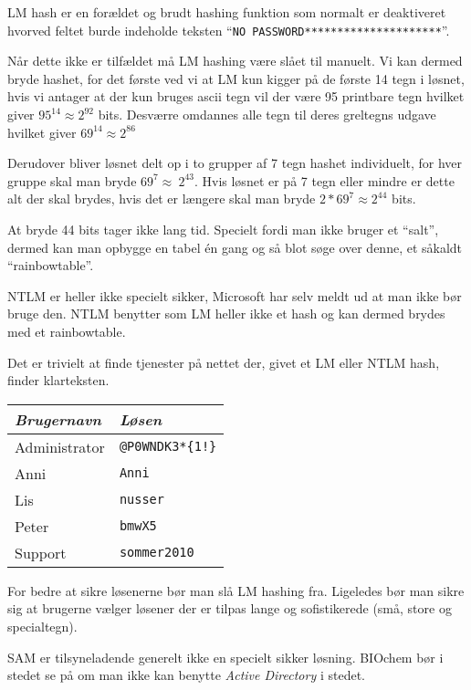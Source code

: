 \documentclass[10pt,a4paper,danish]{article}
\begin{document}
LM hash er en forældet og brudt hashing funktion som normalt er deaktiveret
hvorved feltet burde indeholde teksten ``\texttt{NO
  PASSWORD*********************}''.

Når dette ikke er tilfældet må LM hashing være slået til manuelt.
Vi kan dermed bryde hashet, for det første ved vi at LM kun kigger på de første
14 tegn i løsnet, hvis vi antager at der kun bruges ascii tegn vil der være 95
printbare tegn hvilket giver \(95^{14} \approx 2^{92}\) bits.
Desværre omdannes alle tegn til deres greltegns udgave hvilket giver \(69^{14}
\approx 2^{86}\)

Derudover bliver løsnet delt op i to grupper af 7 tegn hashet individuelt,
for hver gruppe skal man bryde \(69^{7} \approx \ 2^{43}\).
Hvis løsnet er på 7 tegn eller mindre er dette alt der skal brydes, hvis det er
længere skal man bryde \(2 * 69^{7} \approx 2^{44}\) bits.

At bryde 44 bits tager ikke lang tid.
Specielt fordi man ikke bruger et ``salt'', dermed kan man opbygge en tabel én
gang og så blot søge over denne, et såkaldt ``rainbowtable''.


NTLM er heller ikke specielt sikker, Microsoft har selv meldt ud at man ikke bør
bruge den. NTLM benytter som LM heller ikke et hash og kan dermed brydes med et
rainbowtable.

Det er trivielt at finde tjenester\cite{cracker1} \cite{cracker2} på nettet der, givet et LM eller NTLM hash, finder
klarteksten.

\begin{table}[h!]
  \centering
  \begin{tabular}{ll}
    \textit{Brugernavn} & \textit{Løsen} \\
    \hline
    Administrator & \texttt{@P0WNDK3*\{1!\}}\\
    Anni & \texttt{Anni}\\
    Lis & \texttt{nusser}\\
    Peter & \texttt{bmwX5}\\
    Support & \texttt{sommer2010}
  \end{tabular}
\end{table}

For bedre at sikre løsenerne bør man slå LM hashing fra. Ligeledes bør man sikre
sig at brugerne vælger løsener der er tilpas lange og sofistikerede (små, store
og specialtegn).

SAM er tilsyneladende generelt ikke en specielt sikker løsning. BIOchem bør i stedet se på om
man ikke kan benytte \textit{Active Directory} i stedet.
\end{document}
